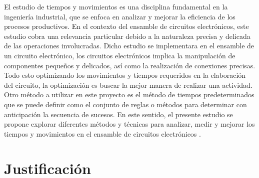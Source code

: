      El estudio de tiempos y movimientos es una disciplina fundamental en la ingeniería industrial, que se enfoca en analizar y mejorar la eficiencia de los procesos productivos. En el contexto del ensamble de circuitos electrónicos, este estudio cobra una relevancia particular debido a la naturaleza precisa y delicada de las operaciones involucradas.
     Dicho estudio se implementara en el ensamble de un circuito electrónico, los circuitos electrónicos implica la manipulación de componentes pequeños y delicados, así como la realización de conexiones precisas. Todo esto optimizando los movimientos y tiempos requeridos en la elaboración del circuito, la optimización es buscar la mejor manera de realizar una actividad.\cite{RAE}  
     Otro método a utilizar en este proyecto es el método de tiempos predeterminados que se puede definir como el conjunto de reglas o métodos para determinar con anticipación la secuencia de sucesos. En este sentido, el presente estudio se propone explorar diferentes métodos y técnicas para analizar, medir y mejorar los tiempos y movimientos en el ensamble de circuitos electrónicos \cite{sistema-tiempos-predeterminados}.
    \section{Justificación}
    
